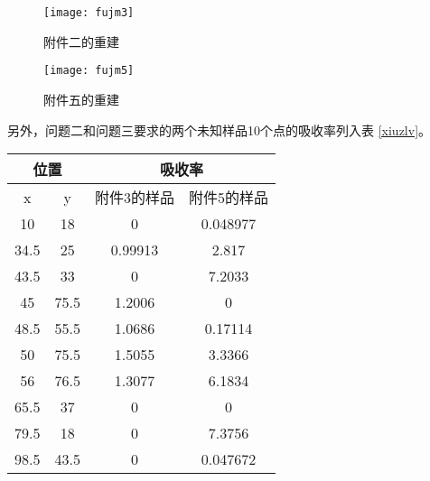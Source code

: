 \documentclass[withoutpreface,bwprint]{cumcmthesis} %
\begin{document}
      \begin{figure}[!htbp]
        \begin{minipage}[t]{0.5\linewidth}
          \centering
          \texttt{[image: fujm3]}
          \caption{附件二的重建}
          \label{isjm2}
        \end{minipage}
        \begin{minipage}[t]{0.5\linewidth}
          \centering
          \texttt{[image: fujm5]}
          \caption{附件五的重建}
          \label{isjm3}
        \end{minipage}
      \end{figure}

      另外，问题二和问题三要求的两个未知样品10个点的吸收率列入表 \ref{xiuzlv}。

      \begin{center}
        \label{xiuzlv}
        \begin{longtable}{|c|c|c|c|}
          \hline
          \multicolumn{2}{|c|}{位置} & \multicolumn{2}{c|}{吸收率} \\ \hline
          x    & y    & 附件3的样品 & 附件5的样品 \\ \hline
          10   & 18   & 0           & 0.048977    \\ \hline
          34.5 & 25   & 0.99913     & 2.817       \\ \hline
          43.5 & 33   & 0           & 7.2033      \\ \hline
          45   & 75.5 & 1.2006      & 0           \\ \hline
          48.5 & 55.5 & 1.0686      & 0.17114     \\ \hline
          50   & 75.5 & 1.5055      & 3.3366      \\ \hline
          56   & 76.5 & 1.3077      & 6.1834      \\ \hline
          65.5 & 37   & 0           & 0           \\ \hline
          79.5 & 18   & 0           & 7.3756      \\ \hline
          98.5 & 43.5 & 0           & 0.047672    \\ \hline
        \end{longtable}
      \end{center}
\end{document}
